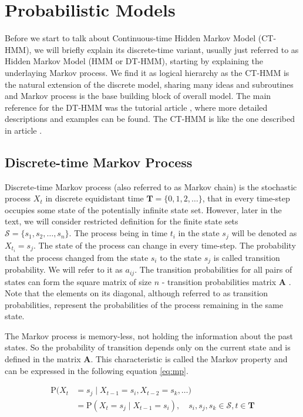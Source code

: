 \documentclass[thesis=M,english]{FITthesis}[2012/10/20]
\newcommand{\matr}[1]{\mathbf{#1}}
\begin{document}

\chapter{Probabilistic Models}

Before we start to talk about Continuous-time Hidden Markov Model (CT-HMM), we will briefly explain its discrete-time variant, usually just referred to as Hidden Markov Model (HMM or DT-HMM), starting by explaining the underlaying Markov process. We find it as logical hierarchy as the CT-HMM is the natural extension of the discrete model, sharing many ideas and subroutines and Markov process is the base building block of overall model. The main reference for the DT-HMM was the tutorial article \cite{Ra89}, where more detailed descriptions and examples can be found. The CT-HMM is like the one described in article \cite{Li15}.

\section{Discrete-time Markov Process}\label{sec:DMP}
    
Discrete-time Markov process (also referred to as Markov chain) \cite{TODO} is the stochastic process $X_t$ in discrete equidistant time $\matr{T} = \{ 0, 1, 2, \dots \}$, that in every time-step occupies some state of the potentially infinite state set. However, later in the text, we will consider restricted definition for the finite state sets $\mathcal{S} = \{ s_1, s_2, \dots, s_n\}$.  The process being in time $t_i$ in the state $s_j$ will be denoted as $X_{t_i} = s_j$. The state of the process can change in every time-step. The probability that the process changed from the state $s_i$ to the state $s_j$ is called transition probability. We will refer to it as $a_{ij}$. The transition probabilities for all pairs of states can form the square matrix of size $n$ - transition probabilities matrix $\matr{A}$ . Note that the elements on its diagonal, although referred to as transition probabilities, represent the probabilities of the process remaining in the same state.

The Markov process is memory-less, not holding the information about the past states. So the probability of transition depends only on the current state and is defined in the matrix $\matr{A}$. This characteristic is called the Markov property and can be expressed in the following equation \eqref{eq:mp}.

\begin{equation}\label{eq:mp}
\begin{aligned}
\mathrm{P}(X_t & = s_j \mid X_{t-1} = s_i, X_{t-2} = s_k, \dots)  \\   
               & = \mathrm{P}(X_t = s_j \mid X_{t-1} = s_i ), \quad s_i,s_j,s_k \in \mathcal{S}, t \in \matr{T}
\end{aligned}
\end{equation}
\end{document}
